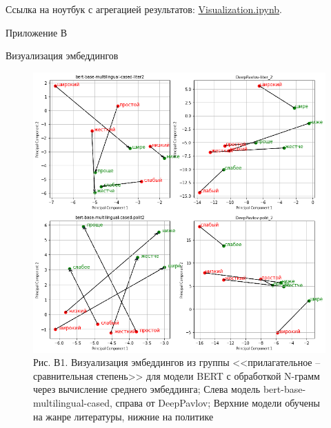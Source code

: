 \documentclass[a4paper,14pt]{article}
\begin{document}
Ссылка на ноутбук с агрегацией результатов: \href{https://github.com/andrsolo21/hse_Af_Tr_BERT/blob/main/Visualization.ipynb}{Visualization.ipynb}.

\newpage


\begin{flushright}
	Приложение В
\end{flushright}

\begin{center}
	Визуализация эмбеддингов
\end{center}


\begin{figure}[H]
	\centering
	\includegraphics[width=0.95\linewidth]{image/pril_2}
	\caption*{Рис. В1. Визуализация эмбеддингов из группы <<прилагательное -- сравнительная степень>> для модели BERT с обработкой N-грамм через вычисление среднего эмбеддинга; Слева модель bert-base-multilingual-cased, справа от DeepPavlov; Верхние модели обучены на жанре литературы, нижние на политике}
	\label{fig:pril22}
\end{figure}
\end{document}

